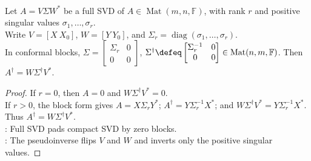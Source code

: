 \begin{corollary} \label{cor:pseudoinverse-from-full-svd} \\
Let $A=V\Sigma W^*$ be a full SVD of $A\in\operatorname{Mat}(m,n,\mathbb{F})$, with rank $r$ and positive singular values $\sigma_1,\ldots,\sigma_r$.\\
Write $V=[X\ X_0]$, $W=[Y\ Y_0]$, and $\Sigma_r=\operatorname{diag}(\sigma_1,\ldots,\sigma_r)$.\\
In conformal blocks, $\Sigma=
\begin{bmatrix}
\Sigma_r&0\\
0&0
\end{bmatrix}$, $\Sigma^{\dagger}\defeq
\begin{bmatrix}
\Sigma_r^{-1}&0\\
0&0
\end{bmatrix}
\in\operatorname{Mat}(n,m,\mathbb{F})$. Then $A^{\dagger}=W\Sigma^{\dagger}V^*$.
\begin{proof}
If $r=0$, then $A=0$ and $W\Sigma^{\dagger}V^*=0$.\\
If $r>0$, the block form gives $A=X\Sigma_rY^*$; $A^{\dagger}=Y\Sigma_r^{-1}X^*$; and $W\Sigma^{\dagger}V^*=Y\Sigma_r^{-1}X^*$. Thus $A^{\dagger}=W\Sigma^{\dagger}V^*$.\\
: Full SVD pads compact SVD by zero blocks.\\
: The pseudoinverse flips $V$ and $W$ and inverts only the positive singular values.
\end{proof}
\end{corollary}

